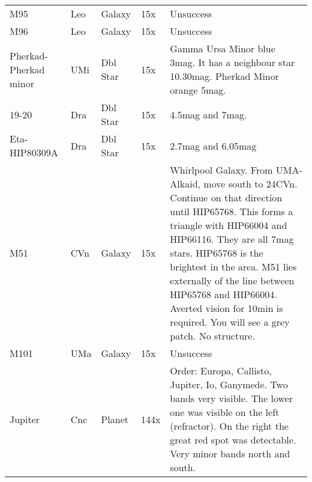 \begin{longtable}{ p{0.8in}  p{0.3in}  p{0.5in}  p{0.9in}  p{5.8in} }
M95 & Leo & Galaxy & 15x & Unsuccess \\ 
M96 & Leo & Galaxy & 15x & Unsuccess \\ 
Pherkad-Pherkad minor & UMi & Dbl Star & 15x & Gamma Ursa Minor blue 3mag. It has a neighbour star 10.30mag. Pherkad Minor orange 5mag. \\ 
19-20 & Dra & Dbl Star & 15x & 4.5mag and 7mag. \\ 
Eta-HIP80309A & Dra & Dbl Star & 15x & 2.7mag and 6.05mag \\ 
M51 & CVn & Galaxy & 15x & Whirlpool Galaxy. From UMA-Alkaid, move south to 24CVn. Continue on that direction until HIP65768. This forms a triangle with HIP66004 and HIP66116. They are all 7mag stars. HIP65768 is the brightest in the area. M51 lies externally of the line between HIP65768 and HIP66004. Averted vision for 10min is required. You will see a grey patch. No structure. \\ 
M101 & UMa & Galaxy & 15x & Unsuccess \\ 
Jupiter & Cnc & Planet & 144x & Order: Europa, Callisto, Jupiter, Io, Ganymede. Two bands very visible. The lower one was visible on the left (refractor). On the right the great red spot was detectable. Very minor bands north and south.  \\ 
\hline 
\end{longtable} 
